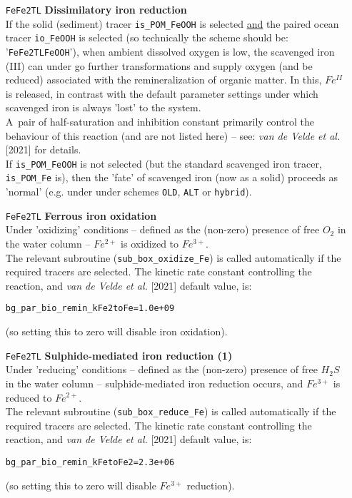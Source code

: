 \begin{itemize}[noitemsep]
\vspace{1mm}
\item [\texttt{FeFe2TL}] \textbf{Dissimilatory iron reduction}
\\If the solid (sediment) tracer \texttt{is\_POM\_FeOOH} is selected \uline{and} the paired ocean tracer \texttt{io\_FeOOH} is selected (so technically the scheme should be: '\texttt{FeFe2TLFeOOH}'), when ambient dissolved oxygen is low, the scavenged iron (III) can under go further transformations and supply oxygen (and be reduced) associated with the remineralization of organic matter. In this, 
\(Fe^{II}\) is released, in contrast with the default parameter settings under which scavenged iron is always 'lost' to the system.
\\A\ pair of half-saturation and inhibition constant primarily control the behaviour of this reaction (and are not listed here) -- see: \textit{van de Velde et al.} [2021] for details. 
\\If \texttt{is\_POM\_FeOOH} is not selected (but the standard scavenged iron tracer, \texttt{is\_POM\_Fe} is), then the 'fate' of scavenged iron (now as a solid) proceeds as 'normal' (e.g. under under schemes \texttt{OLD}, \texttt{ALT} or \texttt{hybrid}).

\vspace{1mm}
\item [\texttt{FeFe2TL}] \textbf{Ferrous iron oxidation}
\\Under 'oxidizing' conditions -- defined as the (non-zero) presence of free \(O_{2}\) in the water column -- \(Fe^{2+}\) is oxidized to \(Fe^{3+}\).
\\The relevant subroutine (\texttt{sub\_box\_oxidize\_Fe}) is called automatically if the required tracers are selected. The kinetic rate constant controlling the reaction, and \textit{van de Velde et al.} [2021] default value, is:
\vspace{-1mm}\small\begin{verbatim}
bg_par_bio_remin_kFe2toFe=1.0e+09
\end{verbatim}\normalsize\vspace{-1mm}
(so setting this to zero will disable iron oxidation).

\vspace{1mm}
\item [\texttt{FeFe2TL}] \textbf{Sulphide-mediated iron reduction (1)}
\\Under 'reducing' conditions -- defined as the (non-zero) presence of free \(H_{2}S\) in the water column -- sulphide-mediated iron reduction occurs, and \(Fe^{3+}\) is reduced to \(Fe^{2+}\).
\\The relevant subroutine (\texttt{sub\_box\_reduce\_Fe}) is called automatically if the required tracers are selected. The kinetic rate constant controlling the reaction, and \textit{van de Velde et al.} [2021] default value, is:
\vspace{-1mm}\small\begin{verbatim}
bg_par_bio_remin_kFetoFe2=2.3e+06
\end{verbatim}\normalsize\vspace{-1mm}
(so setting this to zero will disable \(Fe^{3+}\) reduction).


\end{itemize}
